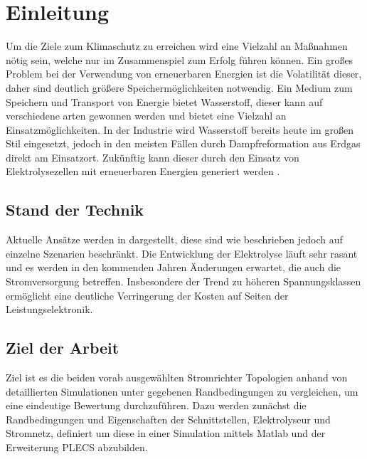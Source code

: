 \chapter{Einleitung}
Um die Ziele zum Klimaschutz zu erreichen wird eine Vielzahl an Maßnahmen nötig sein, welche nur im Zusammenspiel zum Erfolg führen können. Ein großes Problem bei der Verwendung von erneuerbaren Energien ist die Volatilität dieser, daher sind deutlich größere Speichermöglichkeiten notwendig. Ein Medium zum Speichern und Transport von Energie bietet Wasserstoff, dieser kann auf verschiedene arten gewonnen werden und bietet eine Vielzahl an Einsatzmöglichkeiten. In der Industrie wird Wasserstoff bereits heute im großen Stil eingesetzt, jedoch in den meisten Fällen durch Dampfreformation aus Erdgas direkt am Einsatzort. Zukünftig kann dieser durch den Einsatz von Elektrolysezellen mit erneuerbaren Energien generiert werden \cite{Elektrolyse} . 




\section{Stand der Technik}
Aktuelle Ansätze werden in \cite{HydrogenRectifier} dargestellt, diese sind wie beschrieben jedoch auf einzelne Szenarien beschränkt. Die Entwicklung der Elektrolyse läuft sehr rasant und es werden in den kommenden Jahren Änderungen erwartet, die auch die Stromversorgung betreffen. Insbesondere der Trend zu höheren Spannungsklassen ermöglicht eine deutliche Verringerung der Kosten auf Seiten der Leistungselektronik.

\section{Ziel der Arbeit}
Ziel ist es die beiden vorab ausgewählten Stromrichter Topologien anhand von detaillierten Simulationen unter gegebenen Randbedingungen zu vergleichen, um eine eindeutige Bewertung durchzuführen. Dazu werden zunächst die Randbedingungen und Eigenschaften der Schnittstellen, Elektrolyseur und Stromnetz, definiert um diese in einer Simulation mittels Matlab und der Erweiterung PLECS abzubilden. 